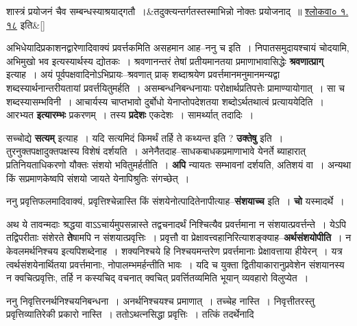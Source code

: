 \documentclass[article,12pt,a4paper]{memoir}
\begin{document}
	  \bigskip
	  \begingroup
	
	    
	    \stanza[\smallbreak]
	शास्त्रं प्रयोजनं चैव सम्बन्धस्याश्रयाद्गतौ ।&तदुक्त्यन्तर्गतस्तस्माभिन्नो नोक्तः प्रयोजनाद् ॥ \href{http://sarit.indology.info/?cref=śv.1.18}{श्लोकवा० १. १८} इति\&[\smallbreak]


	
	  \endgroup
	

	  \pstart अभिधेयादिप्रकाशनद्वारेणादिवाक्यं प्रवर्त्तकमिति असहमान आह--ननु च इति । निपातसमुदायश्चायं चोदयामि, अभिमुखो भव इत्यस्यार्थस्य द्योतकः । श्रवणानन्तरं तेषां प्रतीयमानतया प्रमाणाभावासिद्धेः \textbf{श्रवणात्प्राग्} इत्याह । अयं पूर्वपक्षवादिनोऽभिप्रायः--श्रवणात् प्राक् शब्दाश्रयेण प्रवर्त्तमानमनुमानमन्यद्वा शब्दस्यार्थनान्तरीयतायां प्रवर्त्तयितुमर्हति । असम्बन्धनिबन्धनायाः परोक्षार्थप्रतिपत्तेः प्रामाण्यायोगात् । सा च शब्दस्यासम्भविनी । आचार्यस्य चाप्तभावो दुर्बोधो येनाप्तोपदेशतया शब्दोऽर्थतथात्वं प्रत्याययेदिति । आरभ्यत \textbf{इत्यारम्भः} प्रकरणम् । तस्य \textbf{प्रदेशः} एकदेशः । सामर्थ्यात् तदादिः ।
	\pend
      

	  \pstart सच्चोद्ये \textbf{सत्यम्} इत्याह । यदि सत्यमिदं किमर्थं तर्हि \leavevmode{} ते कथ्यन्त इति ? \textbf{उक्तेषु} इति । तुरनुक्तपक्षादुक्तपक्षस्य विशेषं दर्शयति । अनेनैतदाह--साधकबाधकप्रमाणाभावे येनर्ते ब्याहारात् प्रतिनियताधिकरणो यौक्तः संशयो भवितुमर्हतीति । \textbf{अपि} न्यायतः सम्भावनां दर्शयति, अतिशयं वा । अन्यथा किं सप्रमाणकेष्वपि संशयो जायते येनापिश्रुतिः संगच्छेत् ।
	\pend
      

	  \pstart ननु प्रवृत्तिफलमादिवाक्यं, प्रवृत्तिश्चेन्नास्ति किं संशयेनोत्पादितेनापीत्याह--\textbf{संशयाच्च} इति । \textbf{चो} यस्मादर्थे ।
	\pend
      

	  \pstart अथ ये तावन्मदाः श्रद्धया वाऽऽचार्यमुपसन्नास्ते तद्वचनादर्थं निश्चित्यैव प्रवर्त्तमाना न संशयात्प्रवर्त्तन्ते । येऽपि तद्विपरीताः संशेरते \textbf{ते}षामपि न संशयात्प्रवृत्तिः । प्रवृत्तौ वा प्रेक्षावत्त्वहानिरित्याशङ्क्याह--\textbf{अर्थसंशयोपीति} । न केवलमर्थनिश्चय इत्यपिशब्देनाह । शक्यनिश्चये हि निश्चयमन्तरेण प्रवर्त्तमानाः प्रेक्षावत्ताया हीयेरन् । यत्र त्वर्थसंशयेनार्थितया प्रवर्त्तमानाः, नोपालम्भमर्हन्तीति भावः । यदि च युक्ता द्वितीयाकारानुप्रवेशेन संशयानस्य न क्वचित्प्रवृत्तिः, तर्हि न कस्यचिद् वचनात् क्वचित् प्रवर्त्तितव्यमिति भूयान् व्यवहारो विलुप्येत ।
	\pend
      

	  \pstart ननु निवृत्तिरनर्थनिश्चयनिबन्धना । अनर्थनिश्चयश्च प्रमाणात् । तच्चेह नास्ति । निवृत्तीतरस्तु प्रवृत्तिव्यातिरेकी प्रकारो नास्ति । ततोऽथत्नसिद्धा प्रवृत्तिः । तत्किं तदर्थेनादि \leavevmode{} 
	  
\end{document}
